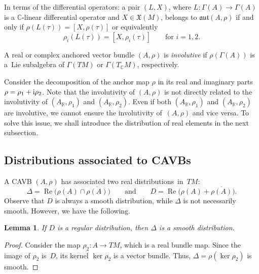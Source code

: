 \documentclass[pdftex]{sigma}
\numberwithin{equation}{section}
\newtheorem{Lemma}[Theorem]{Lemma}
\newcommand{\R}{{\mathbb{R}}}
\newcommand{\C}{{\mathbb{C}}}
\DeclareMathOperator{\re}{Re}
\begin{document}
In terms of the differential operators: a pair $(L,X)$, where $L\colon \Gamma(A)\to \Gamma(A)$ is a $\C$-linear differential operator and $X\in \mathfrak{X}(M)$, belongs to $\mathfrak{aut}(A,\rho)$ if and only if $\rho(L(\tau))=[X,\rho(\tau)]$
or equivalently
\begin{equation*}%
\rho_i(L(\tau))=[X, \rho_i(\tau)]\qquad\text{for $i=1,2$}.
\end{equation*}
\begin{Definition}
A real or complex anchored vector bundle $(A,\rho)$ is {\em involutive} if $\rho(\Gamma(A))$ is a~Lie subalgebra of $\Gamma(TM)$ or $\Gamma(T_{\C}M)$, respectively.
\end{Definition}

Consider the decomposition of the anchor map $\rho$ in its real and imaginary parts ${\rho=\rho_1+{\rm i}\rho_2}$. Note that the involutivity of $(A,\rho)$ is not directly related to the involutivity of $(A_{\R}, \rho_1)$ and $(A_{\R}, \rho_2)$. Even if both $(A_{\R}, \rho_1)$ and $(A_{\R}, \rho_2)$ are involutive, we cannot ensure the involutivity of~$(A,\rho)$ and vice versa. To solve this issue, we shall introduce the distribution of real elements in the next subsection.

\subsection{Distributions associated to CAVBs}
A CAVB $(A,\rho)$ has associated two real distributions~in~$TM$:
 \[\Delta=\re \bigl(\rho(A)\cap \overline{\rho(A)}\bigr)\qquad\text{and} \qquad D=\re \bigl(\rho(A) + \overline{\rho(A)}\bigr).\]
Observe that $D$ is always a smooth distribution, while $\Delta$ is not necessarily smooth. However, we have the following.

 \begin{Lemma}\label{imageanchor}
 If $D$ is a regular distribution, then $\Delta$ is a smooth distribution.
 \end{Lemma}
\begin{proof}
 Consider the map $\rho_2\colon A\to TM$, which is a real bundle map. Since the image of $\rho_2$ is~$D$, its kernel $\ker \rho_2$ is a vector bundle. Thus, $\Delta=\rho(\ker \rho_2)$ is smooth.
\end{proof}
\end{document}
